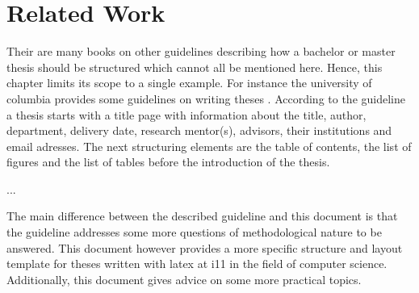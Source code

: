 
\chapter{Related Work}
\label{sect:relatedWork}



Their are many books on other guidelines describing how a bachelor or master thesis should be structured which cannot all be mentioned here.
Hence, this chapter limits its scope to a single example.
For instance the university of columbia provides some guidelines on writing theses \cite{columbia}.
According to the guideline a thesis starts with a title page with information about the title, author, department, delivery date, research mentor(s), advisors, their institutions and email adresses.
The next structuring elements are the table of contents, the list of figures and the list of tables before the introduction of the thesis.

...

The main difference between the described guideline and this document is that the guideline addresses some more questions of methodological nature to be answered.
This document however provides a more specific structure and layout template for theses written with latex at i11 in the field of computer science.
Additionally, this document gives advice on some more practical topics.
